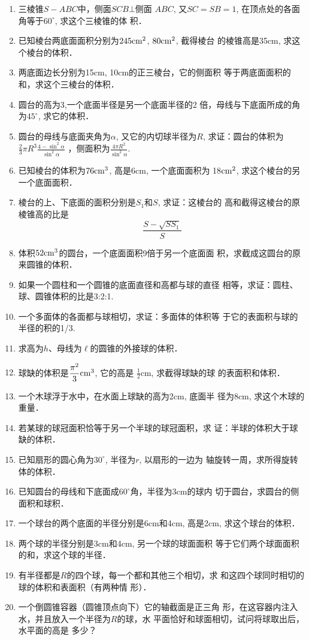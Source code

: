 \begin{enumerate}
\item 三棱锥$S-ABC$中，侧面$SCB\bot$侧面 $ABC$, 又$SC=SB
=1$, 在顶点处的各面角等于$60^{\circ}$, 求这个三棱锥的体
积．
\item 已知棱台两底面面积分别为$245{\rm cm^2}$, $80{\rm cm^2}$, 截得棱台
的棱锥高是35cm, 求这个棱台的体积．
\item 两底面边长分别为15cm, 10cm的正三棱台，它的侧面积
等于两底面面积的和，求这个三棱台的体积．
\item 圆台的高为3,一个底面半径是另一个底面半径的2
倍，母线与下底面所成的角为$45^{\circ}$, 求它的体积．
\item 圆台的母线与底面夹角为$\alpha$, 又它的内切球半径为$R$, 
求证：圆台的体积为$\frac{2}{3}\pi R^3\frac{4-\sin^2\alpha}{\sin^2\alpha}$
，侧面积为$\frac{4\pi R^2}{\sin^2\alpha}$.
\item 已知棱台的体积为$76{\rm cm^3}$, 高是6cm, 一个底面面积为
18${\rm cm^2}$, 求这个棱台的另一个底面面积．
\item 棱台的上、下底面的面积分别是$S_1$和$S$, 求证：这棱台的
高和截得这棱台的原棱锥高的比是
\[\frac{S-\sqrt{SS_1}}{S}\]
\item 体积$52{\rm cm^3}$的圆台，一个底面面积9倍于另一个底面面
积，求截成这圆台的原来圆锥的体积．
\item 如果一个圆柱和一个圆锥的底面直径和高都与球的直径
相等，求证：圆柱、球、圆锥体积的比是3:2:1.
\item 一个多面体的各面都与球相切，求证：多面体的体积等
于它的表面积与球的半径的积的1/3.
\item 求高为$h$、母线为$\ell$的圆锥的外接球的体积．
\item 球缺的体积是$\frac{\pi^2}{3}{\rm cm^3}$, 它的高是
$\frac{1}{2}$cm, 求截得球缺的球
的表面积和体积．
\item 一个木球浮于水中，在水面上球缺的高为2cm, 底面半
径为8cm, 求这个木球的重量．
\item 若某球的球冠面积恰等于另一个半球的球冠面积，求
证：半球的体积大于球缺的体积．
\item 已知扇形的圆心角为$30^{\circ}$, 半径为$r$, 以扇形的一边为
轴旋转一周，求所得旋转体的体积．
\item 已知圆台的母线和下底面成$60^{\circ}$角，半径为3cm的球内
切于圆台，求圆台的侧面积和球积．
\item 一个球台的两个底面的半径分别是6cm和4cm, 高是2cm, 
求这个球台的体积．
\item 两个球的半径分别是3cm和4cm, 另一个球的球面面积
等于它们两个球面面积的和，求这个球的半径．
\item 有半径都是$R$的四个球，每一个都和其他三个相切，求
和这四个球同时相切的球的体积和表面积（有两种情
形）．
\item 一个倒圆锥容器（圆锥顶点向下）它的轴截面是正三角
形，在这容器内注入水，并且放入一个半径为$R$的球，水
平面恰好和球面相切，试问将球取出后，水平面的高是
多少？
\end{enumerate}


